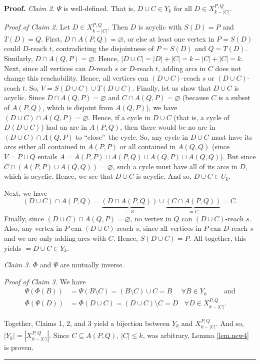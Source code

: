 \documentclass[numbers=enddot,12pt,final,onecolumn,notitlepage]{scrartcl}%
\theoremstyle{definition}
\newenvironment{proof}[1][Proof]{\noindent\textbf{#1.} }{\ \rule{0.5em}{0.5em}}
\theoremstyle{plainsl}
\begin{document}
\begin{proof}
\bigskip\textit{Claim 2.} $\Psi$ is well-defined. That is, $D \cup C \in
Y_{k}$ for all $D \in X_{k-|C|}^{P,Q}$.

\smallskip\textit{Proof of Claim 2.} Let $D \in X_{k-|C|}^{P,Q}$. Then $D$ is
acyclic with $S(D) = P$ and $T(D) = Q$. First, $D \cap A(P,Q) = \varnothing$,
or else at least one vertex in $P = S(D)$ could $D$-reach $t$, contradicting
the disjointness of $P = S(D)$ and $Q = T(D)$. Similarly, $D \cap A(Q,P) =
\varnothing$. Hence, $|D \cup C| = |D| + |C| = k-|C|+|C| = k$. Next, since all
vertices can $D$-reach $s$ or $D$-reach $t$, adding arcs in $C$ does not
change this reachability. Hence, all vertices can $(D \cup C)$-reach $s$ or
$(D \cup C)$-reach $t$. So, $V = S(D \cup C) \cup T(D \cup C)$. Finally, let
us show that $D \cup C$ is acyclic. Since $D \cap A(Q,P) = \varnothing$ and $C
\cap A(Q,P) = \varnothing$ (because $C$ is a subset of $A(P,Q)$, which is
disjoint from $A(Q,P)$), we have $(D \cup C) \cap A(Q,P) = \varnothing$.
Hence, if a cycle in $D \cup C$ (that is, a cycle of $D\left< D\cup C\right>
$) had an arc in $A(P,Q)$, then there would be no arc in $(D \cup C) \cap
A(Q,P)$ to ``close''\ the cycle. So, any cycle in $D \cup C$ must have its
arcs either all contained in $A(P,P)$ or all contained in $A(Q,Q)$ (since $V =
P \sqcup Q$ entails $A = A(P,P) \sqcup A(P,Q) \sqcup A(Q,P) \sqcup A(Q,Q)$).
But since $C \cap(A(P,P) \cup A(Q,Q)) = \varnothing$, such a cycle must have
all of its arcs in $D$, which is acyclic. Hence, we see that $D \cup C$ is
acyclic. And so, $D \cup C \in U_{k}$.

Next, we have
\[
(D \cup C) \cap A(P,Q) = \underbrace{(D \cap A(P,Q))}_{=\varnothing}
\cup\underbrace{(C \cap A(P,Q))}_{=C} = C.
\]
Finally, since $(D \cup C) \cap A(Q,P) = \varnothing$, no vertex in $Q$ can
$(D \cup C)$-reach $s$. Also, any vertex in $P$ can $(D \cup C)$-reach $s$,
since all vertices in $P$ can $D$-reach $s$ and we are only adding arcs with
$C$. Hence, $S(D\cup C)= P$. All together, this yields $= D \cup C \in Y_{k}$.

\bigskip\textit{Claim 3.} $\Phi$ and $\Psi$ are mutually inverse.

\smallskip\textit{Proof of Claim 3.} We have
\begin{align*}
\Psi(\Phi(B))  & = \Psi(B \setminus C) = (B \setminus C) \cup C = B
\ \ \ \ \ \ \forall B \in Y_{k} \ \ \ \ \ \ \ \ \ \ \ \text{and}\\
\Phi(\Psi(D))  & = \Phi(D \cup C) = (D \cup C) \setminus C = D \ \ \ \ \forall
D \in X_{k-|C|}^{P,Q}.
\end{align*}


\bigskip Together, Claims 1, 2, and 3 yield a bijection between $Y_{k}$ and
$X_{k-|C|}^{P,Q}$. And so, $|Y_{k}| = |X_{k-|C|}^{P,Q}|$. Since $C \subseteq
A(P,Q)$, $|C| \leq k$, was arbitrary, Lemma \ref{lem.new4} is proven.
\end{proof}
\end{document}
